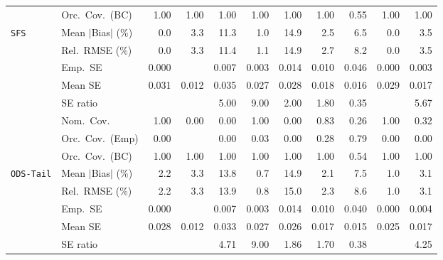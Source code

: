 \begin{landscape}
\begin{longtable}{llrrrrrrrrr}
 & Orc.\ Cov.\ (BC) & \cellcolor{rankone}1.00 & \cellcolor{rankone}1.00 & \cellcolor{rankone}1.00 & \cellcolor{rankone}1.00 & \cellcolor{rankone}1.00 & \cellcolor{rankone}1.00 & \cellcolor{ranktwo}0.55 & \cellcolor{rankone}1.00 & \cellcolor{rankone}1.00 \\
\addlinespace[2pt]
\quad \texttt{SFS} & Mean $|$Bias$|$ (\%) & \cellcolor{rankone}0.0 & 3.3 & 11.3 & \cellcolor{ranktwo}1.0 & 14.9 & \cellcolor{rankthree}2.5 & 6.5 & \cellcolor{rankone}0.0 & 3.5 \\
 & Rel.\ RMSE (\%) & \cellcolor{rankone}0.0 & 3.3 & 11.4 & \cellcolor{ranktwo}1.1 & 14.9 & \cellcolor{rankthree}2.7 & 8.2 & \cellcolor{rankone}0.0 & 3.5 \\
 & Emp.\ SE & 0.000 &  & 0.007 & 0.003 & 0.014 & 0.010 & 0.046 & 0.000 & 0.003 \\
 & Mean SE & 0.031 & 0.012 & 0.035 & 0.027 & 0.028 & 0.018 & 0.016 & 0.029 & 0.017 \\
 & SE ratio &  &  & 5.00 & 9.00 & \cellcolor{rankthree}2.00 & \cellcolor{ranktwo}1.80 & \cellcolor{rankone}0.35 &  & 5.67 \\
 & Nom.\ Cov. & \cellcolor{rankone}1.00 & 0.00 & 0.00 & \cellcolor{rankone}1.00 & 0.00 & \cellcolor{ranktwo}0.83 & 0.26 & \cellcolor{rankone}1.00 & \cellcolor{rankthree}0.32 \\
 & Orc.\ Cov.\ (Emp) & 0.00 &  & 0.00 & \cellcolor{rankthree}0.03 & 0.00 & \cellcolor{ranktwo}0.28 & \cellcolor{rankone}0.79 & 0.00 & 0.00 \\
 & Orc.\ Cov.\ (BC) & \cellcolor{rankone}1.00 & \cellcolor{rankone}1.00 & \cellcolor{rankone}1.00 & \cellcolor{rankone}1.00 & \cellcolor{rankone}1.00 & \cellcolor{rankone}1.00 & \cellcolor{ranktwo}0.54 & \cellcolor{rankone}1.00 & \cellcolor{rankone}1.00 \\
\addlinespace[2pt]
\quad \texttt{ODS-Tail} & Mean $|$Bias$|$ (\%) & 2.2 & 3.3 & 13.8 & \cellcolor{rankone}0.7 & 14.9 & \cellcolor{rankthree}2.1 & 7.5 & \cellcolor{ranktwo}1.0 & 3.1 \\
 & Rel.\ RMSE (\%) & \cellcolor{rankthree}2.2 & 3.3 & 13.9 & \cellcolor{rankone}0.8 & 15.0 & 2.3 & 8.6 & \cellcolor{ranktwo}1.0 & 3.1 \\
 & Emp.\ SE & 0.000 &  & 0.007 & 0.003 & 0.014 & 0.010 & 0.040 & 0.000 & 0.004 \\
 & Mean SE & 0.028 & 0.012 & 0.033 & 0.027 & 0.026 & 0.017 & 0.015 & 0.025 & 0.017 \\
 & SE ratio &  &  & 4.71 & 9.00 & \cellcolor{rankthree}1.86 & \cellcolor{ranktwo}1.70 & \cellcolor{rankone}0.38 &  & 4.25 \\

\end{longtable}
\end{landscape}
